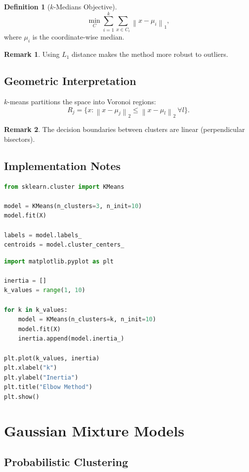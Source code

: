 \documentclass[12pt,oneside]{book}
\numberwithin{equation}{section}
\theoremstyle{definition}
\newtheorem{definition}{Definition}[section]
\newtheorem{remark}{Remark}[section]
\theoremstyle{plain}
\theoremstyle{remark}
\newcommand{\norm}[1]{\left\lVert #1 \right\rVert}
\begin{document}
\begin{definition}[$k$-Medians Objective]
\[
\min_{C}
\sum_{i=1}^k
\sum_{x \in C_i}
\norm{x-\mu_i}_1,
\]
where $\mu_i$ is the coordinate-wise median.
\end{definition}

\begin{remark}
Using $L_1$ distance makes the method more robust to outliers.
\end{remark}

\section{Geometric Interpretation}

$k$-means partitions the space into Voronoi regions:
\[
R_j = \{x : \norm{x-\mu_j}_2 \leq \norm{x-\mu_l}_2 \ \forall l\}.
\]

\begin{remark}
The decision boundaries between clusters are linear (perpendicular bisectors).
\end{remark}

\section{Implementation Notes}

\begin{lstlisting}[language=Python]
from sklearn.cluster import KMeans

model = KMeans(n_clusters=3, n_init=10)
model.fit(X)

labels = model.labels_
centroids = model.cluster_centers_
\end{lstlisting}

\begin{lstlisting}[language=Python]
import matplotlib.pyplot as plt

inertia = []
k_values = range(1, 10)

for k in k_values:
    model = KMeans(n_clusters=k, n_init=10)
    model.fit(X)
    inertia.append(model.inertia_)

plt.plot(k_values, inertia)
plt.xlabel("k")
plt.ylabel("Inertia")
plt.title("Elbow Method")
plt.show()
\end{lstlisting}

\chapter{Gaussian Mixture Models}

\section{Probabilistic Clustering}
\end{document}
